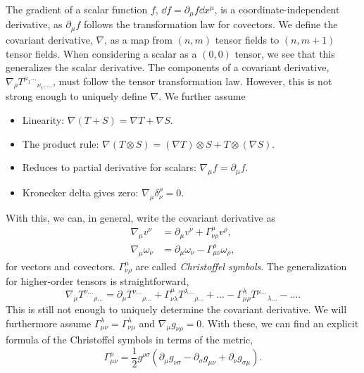 The gradient of a scalar function $f$, $\dd f = \partial_\mu f \dd x^\mu$, is a coordinate-independent derivative, as $\partial_\mu f$ follows the transformation law for covectors.
We define the covariant derivative, $\nabla$, as a map from $(n, m)$ tensor fields to $(n, m+1)$ tensor fields.
When considering a scalar as a $(0, 0)$ tensor, we see that this generalizes the scalar derivative.
The components of a covariant derivative, $\nabla_\rho T^{\mu_1\dots}{}_{\nu_1, \dots}$, must follow the tensor transformation law. 
However, this is not strong enough to uniquely define $\nabla$.
We further assume
%
\begin{itemize}
    \item Linearity: $\nabla (T + S) = \nabla T + \nabla S$.
    \item The product rule: $\nabla (T \otimes S) = (\nabla T)\otimes S + T \otimes (\nabla S)$.
    \item Reduces to partial derivative for scalars: $\nabla_\mu f = \partial_\mu f$.
    \item Kronecker delta gives zero: $\nabla_\mu \delta^\rho_\nu = 0$.
\end{itemize}
%
With this, we can, in general, write the covariant derivative as~\autocite{carrollSpacetimeGeometryIntroduction2019}
%
\begin{align}
    \label{covariant derivative diff geom}
    \nabla_\mu v^\nu &= \partial_\mu v^\nu + \Gamma^\mu_{\nu \rho} v^\rho, \\
    \label{covariant derivative diff geom covector}
    \nabla_\mu \omega_\nu &= \partial_\mu \omega_\nu - \Gamma^\rho_{\mu \nu} \omega_\rho,
\end{align}
%
for vectors and covectors.
$\Gamma^{\mu}_{\nu \rho}$ are called \emph{Christoffel symbols}.
The generalization for higher-order tensors is straightforward, 
%
\begin{equation}
    \nabla_\mu T^{\nu\dots}{}_{\rho\dots}
    =
    \partial_\mu T^{\nu\dots}{}_{\rho\dots}
    + \Gamma^\mu_{\nu \lambda} T^{\lambda\dots}{}_{\rho\dots} +\dots
    - \Gamma^\lambda_{\mu \rho} T^{\mu\dots}{}_{\lambda\dots} -\dots.
\end{equation} 
%
This is still not enough to uniquely determine the covariant derivative.
We will furthermore assume $\Gamma^{\lambda}_{\mu \nu} = \Gamma^{\lambda}_{\nu \mu}$ and $\nabla_\mu g_{\nu \rho} = 0$.
With these, we can find an explicit formula of the Christoffel symbols in terms of the metric,
%
\begin{equation}
    \label{christoffel symbols from metric}
    \Gamma^\rho_{\mu \nu} = \frac{1}{2} g^{\rho \sigma} (\partial_\mu g_{\nu \sigma} - \partial_\sigma g_{\mu \nu} + \partial_{\nu}g_{\sigma \mu}).
\end{equation}
